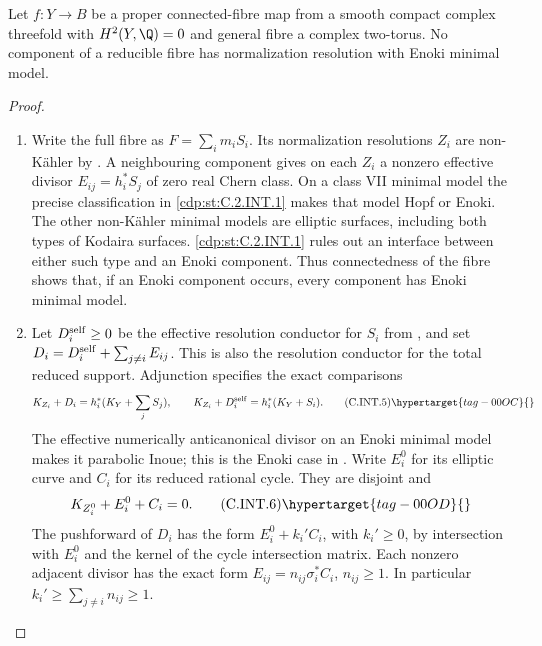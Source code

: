 \begin{proposition}\hypertarget{tag-01C1}{}\label{cdp:st:C.2.INT.2}


Let $f:Y\to B$ be a proper connected-fibre map from a
smooth compact complex threefold with $H^2(Y,\Q)=0$
and general fibre a complex two-torus. No component
of a reducible fibre has normalization resolution
with Enoki minimal model.
\end{proposition}


\begin{proof}

\begin{enumerate}[label=\arabic*.,leftmargin=*]
\item Write the full fibre as $F=\sum_i m_iS_i$. Its
normalization resolutions $Z_i$ are non-K\"ahler by
. A neighbouring component gives on each $Z_i$
a nonzero effective divisor $E_{ij}=h_i^*S_j$ of
zero real Chern class. On a class VII minimal model
the precise classification in \ref{cdp:st:C.2.INT.1} makes that
model Hopf or Enoki. The other non-K\"ahler minimal
models are elliptic surfaces, including both types
of Kodaira surfaces. \ref{cdp:st:C.2.INT.1} rules out an interface
between either such type and an Enoki component.
Thus connectedness of the fibre shows that, if an
Enoki component occurs, every component has Enoki
minimal model.

\item Let $D_i^{\rm self}\ge0$ be the effective resolution
conductor for $S_i$ from , and set
$D_i=D_i^{\rm self}+\sum_{j\ne i}E_{ij}$. This is
also the resolution conductor for the total reduced
support. Adjunction specifies the exact comparisons
\[
 K_{Z_i}+D_i=h_i^*(K_Y+\sum_j S_j),\qquad
 K_{Z_i}+D_i^{\rm self}=h_i^*(K_Y+S_i).
 \tag{C.INT.5}\hypertarget{tag-00OC}{}\label{cdp:eq:C.INT.5}
\]
The effective numerically anticanonical divisor on
an Enoki minimal model makes it parabolic Inoue;
this is the Enoki case in
\cite[Lemma~2.22 and the following paragraph]{Dloussky2006}.
Write $E_i^0$ for its elliptic curve and $C_i$ for
its reduced rational cycle. They are disjoint and
\[
 K_{Z_i^0}+E_i^0+C_i=0.
 \tag{C.INT.6}\hypertarget{tag-00OD}{}\label{cdp:eq:C.INT.6}
\]
The pushforward of $D_i$ has the form
$E_i^0+k_i' C_i$, with $k_i'\ge0$, by intersection
with $E_i^0$ and the kernel of the cycle intersection
matrix. Each nonzero adjacent divisor has the exact
form $E_{ij}=n_{ij}\sigma_i^*C_i$, $n_{ij}\ge1$.
In particular $k_i'\ge\sum_{j\ne i}n_{ij}\ge1$.


\end{enumerate}
\end{proof}
